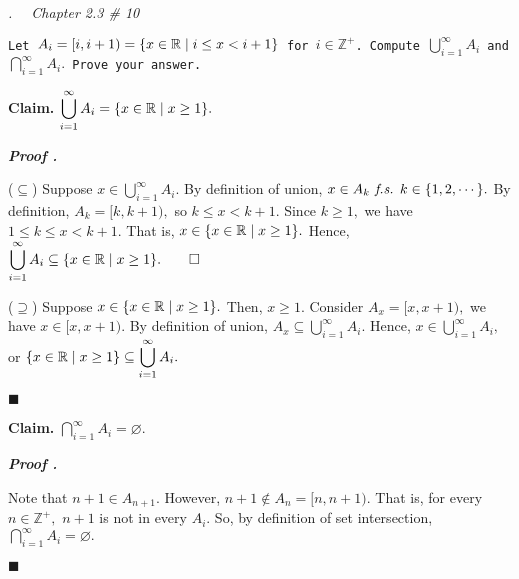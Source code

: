 \documentclass[11pt,letter]{article}
\newcounter{nq}[section]
\newcounter{np}[section]
\newenvironment*{p}{\par\noindent\textbf{\textit{Proof \stepcounter{np}\thenp. }}\par}{\par\hfill $\blacksquare$\par}
\newenvironment*{q}[1]{\noindent\emph{\thesection.\stepcounter{nq}\thenq$\quad $ #1}\par\noindent\texttt}{}
\newenvironment*{clm}{\par\noindent\textbf{Claim. }}{\par}
\def\Z{{\mathbb{Z}}}
\def\R{{\mathbb{R}}}
\def\Zp{{\Z^+}}
\def\emptyset{\varnothing}
\def\fs{\emph{ f.s. }}
\def\dsst{\displaystyle}
\begin{document}
\begin{framed}\begin{q}
	{Chapter 2.3 \# 10}
	{Let $A_i=[i,i+1)=\qty{x\in\R\mid i\leq x<i+1}$ for $i\in\Zp$. Compute $\dsst\bigcup_{i=1}^\infty A_i$ and $\dsst\bigcap_{i=1}^\infty A_i.$ Prove your answer.}
\end{q}\end{framed}
\begin{clm}
	$\dsst\bigcup_{i=1}^\infty A_i=\qty{x\in\R\mid x\geq1}.$
\end{clm}
\begin{p}
	($\subseteq$) Suppose $x\in\dsst\bigcup_{i=1}^\infty A_i.$ By definition of union, $x\in A_k\fs k\in\qty{1,2,\cdots}.$ By definition, $A_k=[k,k+1),$ so $k\leq x<k+1.$ Since $k\geq1,$ we have $1\leq k\leq x<k+1.$ That is, $x\in\qty{x\in\R\mid x\geq1}.$ Hence, $\dsst\bigcup_{i=1}^\infty A_i\subseteq\qty{x\in\R\mid x\geq1}.\qquad\square$\par 
	($\supseteq$) Suppose $x\in\qty{x\in\R\mid x\geq1}.$ Then, $x\geq1.$ Consider $A_x=[x,x+1),$ we have $x\in[x,x+1).$ By definition of union, $A_x\subseteq\dsst\bigcup_{i=1}^\infty A_i.$ Hence, $x\in\dsst\bigcup_{i=1}^\infty A_i,$ or $\qty{x\in\R\mid x\geq1}\subseteq\dsst\bigcup_{i=1}^\infty A_i.$
\end{p}
\begin{clm}
	$\dsst\bigcap_{i=1}^\infty A_i=\emptyset.$
\end{clm}
\begin{p}
	Note that $n+1\in A_{n+1}$.	However, $n+1\notin A_n=[n,n+1).$ That is, for every $n\in\Zp,$ $n+1$ is not in every $A_i.$ So, by definition of set intersection, $\dsst\bigcap_{i=1}^\infty A_i=\emptyset.$
\end{p}
\end{document}
